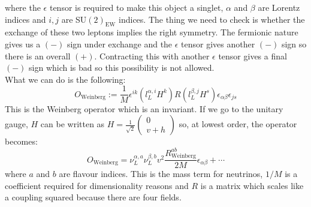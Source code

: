 \documentclass[../main.tex]{subfiles}
\begin{document}
where the $\epsilon$ tensor is required to make this object a singlet, $\alpha$ and $\beta$ are Lorentz indices and $i,j$ are SU$(2)_{\text{EW}}$ indices. The thing we need to check is whether the exchange of these two leptons implies the right symmetry. The fermionic nature gives us a $(-)$ sign under exchange and the $\epsilon$ tensor gives another $(-)$ sign so there is an overall $(+)$. Contracting this with another $\epsilon$ tensor gives a final $(-)$ sign which is bad so this possibility is not allowed. \\
What we can do is the following:
\[
O_{\text{Weinberg}}:=\frac{1}{M}\epsilon^{ik}(l_L^{\alpha,i}H^k)R(l_L^{\beta,j}H^s)\epsilon_{\alpha\beta}\epsilon_{js}
\]
This is the Weinberg operator which is an invariant. If we go to the unitary gauge, $H$ can be written as $H=\frac{1}{\sqrt{2}}\begin{pmatrix}0\\v+h\end{pmatrix}$ so, at lowest order, the operator becomes:
\[
O_{\text{Weinberg}}=\nu_L^{\alpha,a}\nu_L^{\beta,b}v^2\frac{R^{ab}_{\text{Weinberg}}}{2M}\epsilon_{\alpha\beta}+\cdots
\]
where $a$ and $b$ are flavour indices. This is the mass term for neutrinos, $1/M$ is a coefficient required for dimensionality reasons and $R$ is a matrix which scales like a coupling squared because there are four fields.\\ 
\end{document}
